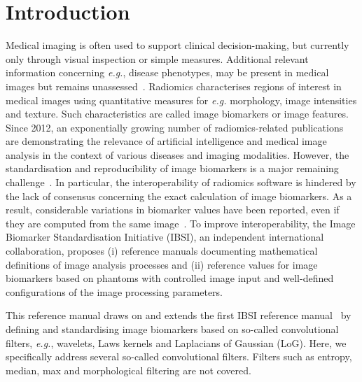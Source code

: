\documentclass[fleqn,a4paper,oneside,openany]{book}
\begin{document}
\mainmatter

\chapter{Introduction}
%
Medical imaging is often used to support clinical decision-making, but currently only through visual inspection or simple measures.
Additional relevant information concerning \textit{e.g.}, disease phenotypes, may be present in medical images but remains unassessed~\cite{Lambin2017}.
Radiomics characterises regions of interest in medical images using quantitative measures for \textit{e.g.} morphology, image intensities and texture.
Such characteristics are called image biomarkers or image features.
Since 2012, an exponentially growing number of radiomics-related publications are demonstrating the relevance of artificial intelligence and medical image analysis in the context of various diseases and imaging modalities.
However, the standardisation and reproducibility of image biomarkers is a major remaining challenge~\cite{Zwanenburg2019-ky}.
In particular, the interoperability of radiomics software is hindered by the lack of consensus concerning the exact calculation of image biomarkers.
As a result, considerable variations in biomarker values have been reported, even if they are computed from the same image~\cite{Hatt2017-zp,Bogowicz2017-kh,Foy2018-mx}.
To improve interoperability, the Image Biomarker Standardisation Initiative (IBSI), an independent international collaboration, proposes (i) reference manuals documenting mathematical definitions of image analysis processes and (ii) reference values for image biomarkers based on phantoms with controlled image input and well-defined configurations of the image processing parameters.

This reference manual draws on and extends the first IBSI reference manual~\cite{ZLV2017} by defining and standardising image biomarkers based on so-called convolutional filters, \textit{e.g.}, wavelets, Laws kernels and Laplacians of Gaussian (LoG).
Here, we specifically address several so-called convolutional filters.
Filters such as entropy, median, max and morphological filtering are not covered.
\end{document}
